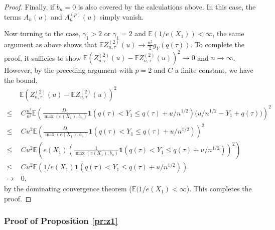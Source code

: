 \documentclass[12pt]{amsart}
\newcommand{\1}{\mathbbm{1}}
\newcommand{\0}{\mathbf{0}}
\newcommand{\one}{\mathbf{1}}
\newcommand{\E}{\mathbb{E}}
\theoremstyle{plain}
\theoremstyle{definition}
\begin{document}
\begin{proof}
Finally, if $b_n=0$ is also covered by the calculations above.  In this case, the terms $A_n(u)$ and $A_n^{(p)}(u)$ simply vanish. 

 Now turning to the case, $\gamma_1>2$ or $\gamma_1=2$ and $\E(1/e(X_1))<\infty$, the same argument as above shows that $\E Z_{n,\tau}^{(2)}(u)\to \frac{u^2}{2}g_Y(q(\tau))$.  To complete the proof, it sufficies to show
$\E(Z_{n,\tau}^{(2)}(u)-\E Z_{n,\tau}^{(2)}(u))^2\to 0$ and $n\to \infty$. However, by the preceding argument with $p=2$ and $C$ a finite constant, we have the bound,
\begin{align*}
  &\E\left(Z^{(2)}_{n,\tau}(u) -\E Z^{(2)}_{n,\tau}(u)\right)^2\\
\leq & ~C\frac{n^{3}}{n^{2}} \E\left(  \frac{D_1}{\max(e(X_1),b_n)} \one
  (q(\tau)<Y_1\leq q(\tau)+ u/n^{1/2}) \bigl(
  u/n^{1/2}-Y_1+q(\tau)\bigr) \right)^2\\
  \leq & ~C u^2\E\left( \frac{D_1}{\max(e(X_1),b_n)} \one
  (q(\tau)<Y_1\leq q(\tau)+ u/n^{1/2})  \right)^2\\
  \leq & ~C u^2\E\left(e(X_1)\left(  \frac{1}{\max(e(X_1),b_n)} \one
  (q(\tau)<Y_1\leq q(\tau)+ u/n^{1/2})\right)^2 \right)\\
  \leq & ~C u^2\E\left(1/e(X_1) \one
  (q(\tau)<Y_1\leq q(\tau)+ u/n^{1/2})\right)\\
  \to & ~0,
\end{align*}
by the dominating convergence theorem ($\E(1/e(X_1)<\infty$).  This completes the proof.

\end{proof}




\subsubsection{Proof of Proposition \ref{pr:z1}} 
\end{document}
